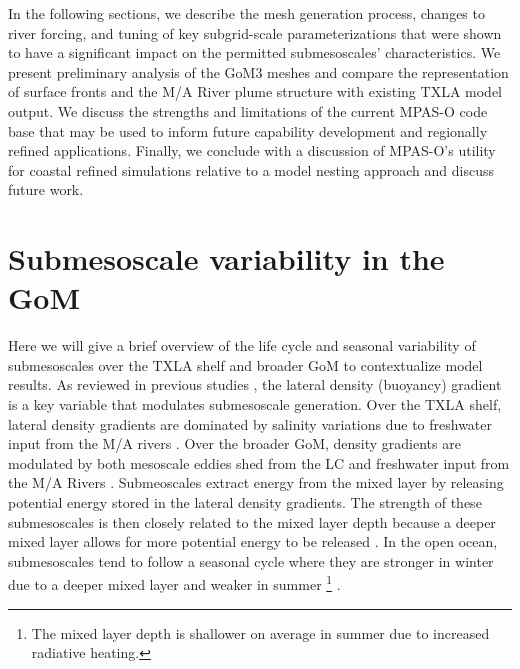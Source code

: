 In the following sections, we describe the mesh generation process, changes to river forcing, and tuning of key subgrid-scale parameterizations that were shown to have a significant impact on the permitted submesoscales' characteristics. We present preliminary analysis of the GoM3 meshes and compare the representation of surface fronts and the M/A River plume structure with existing TXLA model output. We discuss the strengths and limitations of the current MPAS-O code base that may be used to inform future capability development and regionally refined applications. Finally, we conclude with a discussion of MPAS-O's utility for coastal refined simulations relative to a model nesting approach and discuss future work.

\section{Submesoscale variability in the GoM}
Here we will give a brief overview of the life cycle and seasonal variability of submesoscales over the TXLA shelf and broader GoM to contextualize model results. As reviewed in previous studies \citep{McWilliams_2016, taylor2023submesoscale}, the lateral density (buoyancy) gradient is a key variable that modulates submesoscale generation. Over the TXLA shelf, lateral density gradients are dominated by salinity variations due to freshwater input from the M/A rivers \citep{Hetland_2017}. Over the broader GoM, density gradients are modulated by both mesoscale eddies shed from the LC and freshwater input from the M/A Rivers \citep{bracco2019mesoscale, liu2021submesoscale}. Submeoscales extract energy from the mixed layer by releasing potential energy stored in the lateral density gradients. The strength of these submesoscales is then closely related to the mixed layer depth because a deeper mixed layer allows for more potential energy to be released \citep{boccaletti2007mixed, fox2008parameterization}. In the open ocean, submesoscales tend to follow a seasonal cycle where they are stronger in winter due to a deeper mixed layer and weaker in summer \footnote{The mixed layer depth is shallower on average in summer due to increased radiative heating.} \citep{callies2015seasonality}. 

